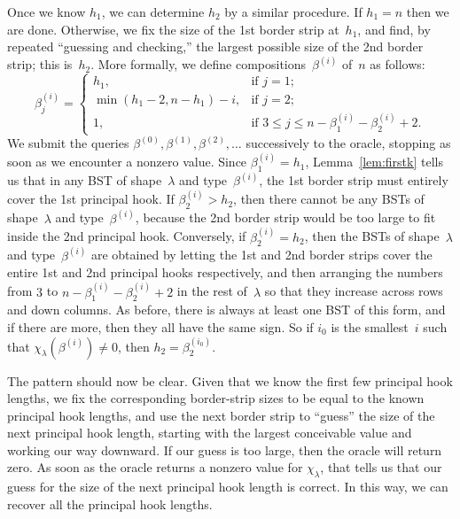 \documentclass[12pt]{article}
\theoremstyle{definition}
\begin{document}
Once we know $h_1$, we can determine $h_2$ by a similar procedure.
If $h_1 = n$ then we are done.
Otherwise, we fix the size of the 1st border strip at~$h_1$,
and find, by repeated ``guessing and checking,''
the largest possible size of
the 2nd border strip; this is~$h_2$.  More formally,
we define compositions~$\beta^{(i)}$ of~$n$ as follows:
\begin{equation*}
\beta^{(i)}_j = 
\begin{cases}
h_1, & \mbox{if $j=1$;}\\
\min(h_1 - 2, n - h_1) - i, & \mbox{if $j=2$;}\\
1, &\mbox{if $3\le j \le n - \beta^{(i)}_1 - \beta^{(i)}_2 + 2$.}
\end{cases}
\end{equation*}
We submit the queries
$\beta^{(0)}, \beta^{(1)}, \beta^{(2)}, \ldots$
successively to the oracle,
stopping as soon as we encounter a nonzero value.
Since $\beta^{(i)}_1 = h_1$, Lemma~\ref{lem:firstk} tells us
that in any BST of shape~$\lambda$ and type~$\beta^{(i)}$,
the 1st border strip must entirely cover the 1st principal hook.
If $\beta^{(i)}_2 > h_2$, then there cannot be any BSTs
of shape~$\lambda$ and type~$\beta^{(i)}$,
because the 2nd border strip would be too large to fit inside
the 2nd principal hook.
Conversely, if $\beta^{(i)}_2 = h_2$,
then the BSTs of shape~$\lambda$ and type~$\beta^{(i)}$
are obtained by letting the 1st and 2nd border strips
cover the entire 1st and 2nd principal hooks respectively,
and then arranging the numbers from
$3$ to $n - \beta^{(i)}_1 - \beta^{(i)}_2 + 2$
in the rest of~$\lambda$ so that they increase
across rows and down columns.
As before, there is always at least one BST
of this form, and if there are more, then they all have the same sign.
So if $i_0$ is the smallest~$i$ such that
$\chi_\lambda(\beta^{(i)}) \ne 0$,
then $h_2 = \beta^{(i_0)}_2$.

The pattern should now be clear.
Given that we know the first few principal hook lengths,
we fix the corresponding border-strip sizes to be equal to
the known principal hook lengths,
and use the next border strip to ``guess''
the size of the next principal hook length,
starting with the largest conceivable value
and working our way downward.
If our guess is too large, then the oracle will return zero.
As soon as the oracle returns a nonzero value for $\chi_\lambda$,
that tells us that our guess for
the size of the next principal hook length is correct.
In this way, we can recover all the principal hook lengths.
\end{document}
